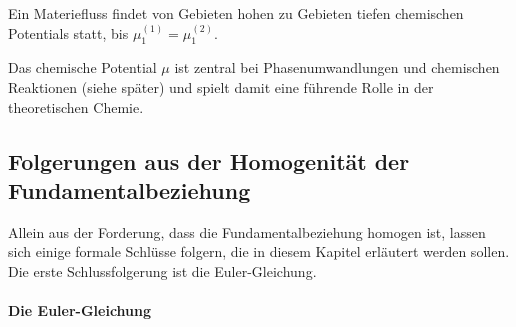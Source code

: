 \begin{formal}
    Ein Materiefluss findet von Gebieten hohen zu Gebieten tiefen chemischen Potentials statt, bis $\mu_1^{(1)} = \mu_1^{(2)}$.
\end{formal}

Das chemische Potential $\mu$ ist zentral bei Phasenumwandlungen und chemischen Reaktionen (siehe später) und spielt damit eine führende Rolle in der theoretischen Chemie.



\subsection{Folgerungen aus der Homogenität der Fundamentalbeziehung}

Allein aus der Forderung, dass die Fundamentalbeziehung homogen ist, lassen sich einige formale Schlüsse folgern, die in diesem Kapitel erläutert werden sollen. Die erste Schlussfolgerung ist die Euler-Gleichung.

\paragraph*{Die Euler-Gleichung}

